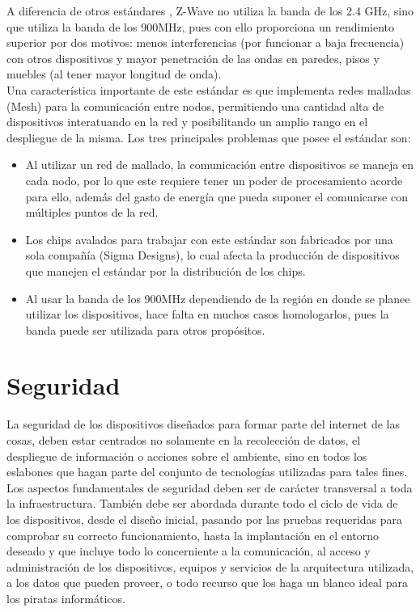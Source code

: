A diferencia de otros estándares , Z-Wave no utiliza la banda de los 2.4 GHz, sino que utiliza la banda de los 900MHz, pues con ello proporciona un rendimiento superior por dos motivos: menos interferencias (por funcionar a baja frecuencia) con otros dispositivos y mayor penetración de las ondas en paredes, pisos y muebles (al tener mayor longitud de onda).\cite{pandomzwave}\\

Una característica importante de este estándar es que  implementa redes malladas (Mesh) para la comunicación entre nodos, permitiendo una cantidad alta de dispositivos interatuando en la red y posibilitando un amplio rango en el despliegue de la misma. Los tres principales problemas que posee el estándar son:
\begin{itemize}
\item  Al utilizar un red de mallado, la comunicación entre dispositivos se maneja en cada nodo, por lo que este requiere tener un poder de procesamiento acorde para ello, además del gasto de energía que pueda suponer el comunicarse con múltiples puntos de la red.
\item Los chips avalados para trabajar con este estándar son fabricados por una sola compañía (Sigma Designs), lo cual afecta la producción de dispositivos  que manejen el estándar por la distribución de los chips.
\item Al usar la banda de los 900MHz dependiendo de la región en donde se planee utilizar los dispositivos, hace falta en muchos casos homologarlos, pues la banda puede ser utilizada para otros propósitos.
\end{itemize}

\section{Seguridad}
La seguridad de los dispositivos diseñados para formar parte del internet de las cosas, deben estar centrados no solamente en la recolección de datos, el despliegue de información o acciones sobre el ambiente, sino en todos los eslabones que hagan parte del conjunto de tecnologías utilizadas para tales fines.\\

Los aspectos fundamentales de seguridad deben ser de carácter transversal a toda la infraestructura. También debe ser abordada durante todo el ciclo de vida de los dispositivos, desde el diseño inicial, pasando por las pruebas requeridas para comprobar su correcto funcionamiento, hasta la implantación en el entorno deseado y que incluye todo lo concerniente a la comunicación, al acceso y administración de los dispositivos, equipos y servicios de la arquitectura utilizada, a los datos que pueden proveer, o todo recurso que los haga un blanco ideal para los piratas informáticos.\\

